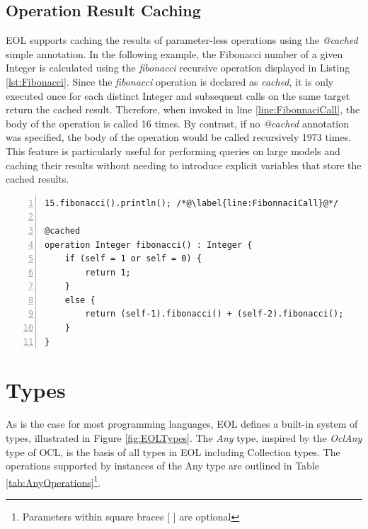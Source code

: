 \subsection{Operation Result Caching}
\label{sec:EolCaching}

EOL supports caching the results of parameter-less operations using the \emph{@cached} simple annotation. In the following example, the Fibonacci number of a given Integer is calculated using the \emph{fibonacci} recursive operation displayed in Listing \ref{lst:Fibonacci}. Since the \emph{fibonacci} operation is declared as \emph{cached}, it is only executed once for each distinct Integer and subsequent calls on the same target return the cached result. Therefore, when invoked in line \ref{line:FibonnaciCall}, the body of the operation is called 16 times. By contrast, if no \emph{@cached} annotation was specified, the body of the operation would be called recursively 1973 times. This feature is particularly useful for performing queries on large models and caching their results without needing to introduce explicit variables that store the cached results.

\begin{lstlisting}[basicstyle=\ttfamily\footnotesize, flexiblecolumns=true, numbers=left, nolol=true, caption=Calculating the Fibonacci number using a cached operation, label=lst:Fibonacci, language=EOL, tabsize=2]
15.fibonacci().println(); /*@\label{line:FibonnaciCall}@*/

@cached
operation Integer fibonacci() : Integer {
	if (self = 1 or self = 0) {
		return 1;
	}
	else {
		return (self-1).fibonacci() + (self-2).fibonacci();
	}
}
\end{lstlisting}

\section{Types}

As is the case for most programming languages, EOL defines a built-in system of types, illustrated in Figure \ref{fig:EOLTypes}. The \emph{Any} type, inspired by the \emph{OclAny} type of OCL, is the basis of all types in EOL including Collection types. The operations supported by instances of the Any type are outlined in Table \ref{tab:AnyOperations}\footnote{Parameters within square braces [ ] are optional}.

\clearpage

